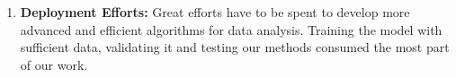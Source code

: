 \begin{enumerate}
\item \textbf{Deployment Efforts:} Great efforts have to be spent to develop more advanced and efficient algorithms for data analysis. Training the model with sufficient data, validating it and testing our methods consumed the most part of our work. 
\end{enumerate}
\label{sec:Research questions and Challenges}